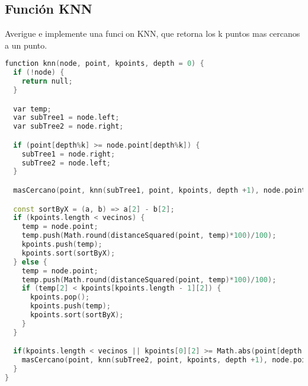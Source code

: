 \subsection{Función KNN}
Averigue e implemente una funcion KNN, que retorna los k puntos mas cercanos a un punto.

\begin{lstlisting}[language=C++,
                   directivestyle={\color{black}}
                   emph={int,char,double,float,unsigned},
                   emphstyle={\color{blue}}
                  ]
function knn(node, point, kpoints, depth = 0) {
  if (!node) {
    return null;
  }

  var temp;
  var subTree1 = node.left;
  var subTree2 = node.right;

  if (point[depth%k] >= node.point[depth%k]) {
    subTree1 = node.right;
    subTree2 = node.left;
  }

  masCercano(point, knn(subTree1, point, kpoints, depth +1), node.point);

  const sortByX = (a, b) => a[2] - b[2];
  if (kpoints.length < vecinos) {
    temp = node.point;
    temp.push(Math.round(distanceSquared(point, temp)*100)/100);
    kpoints.push(temp);
    kpoints.sort(sortByX);
  } else {
    temp = node.point;
    temp.push(Math.round(distanceSquared(point, temp)*100)/100);
    if (temp[2] < kpoints[kpoints.length - 1][2]) {
      kpoints.pop();
      kpoints.push(temp);
      kpoints.sort(sortByX);
    }
  }

  if(kpoints.length < vecinos || kpoints[0][2] >= Math.abs(point[depth % k] - node.point[depth%k])) {
    masCercano(point, knn(subTree2, point, kpoints, depth +1), node.point);
  }
}
\end{lstlisting}